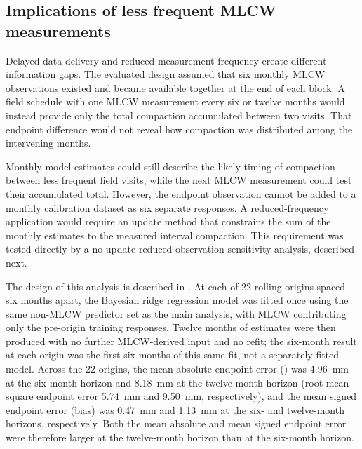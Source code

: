 \subsection{Implications of less frequent MLCW measurements}
\label{subsec:discussion_reduced_sampling}

Delayed data delivery and reduced measurement frequency create different information gaps. The evaluated design assumed that six monthly MLCW observations existed and became available together at the end of each block. A field schedule with one MLCW measurement every six or twelve months would instead provide only the total compaction accumulated between two visits. That endpoint difference would not reveal how compaction was distributed among the intervening months.

Monthly model estimates could still describe the likely timing of compaction between less frequent field visits, while the next MLCW measurement could test their accumulated total. However, the endpoint observation cannot be added to a monthly calibration dataset as six separate responses. A reduced-frequency application would require an update method that constrains the sum of the monthly estimates to the measured interval compaction. This requirement was tested directly by a no-update reduced-observation sensitivity analysis, described next.

The design of this analysis is described in . At each of 22 rolling origins spaced six months apart, the Bayesian ridge regression model was fitted once using the same non-MLCW predictor set as the main analysis, with MLCW contributing only the pre-origin training responses. Twelve months of estimates were then produced with no further MLCW-derived input and no refit; the six-month result at each origin was the first six months of this same fit, not a separately fitted model. Across the 22 origins, the mean absolute endpoint error () was 4.96~mm at the six-month horizon and 8.18~mm at the twelve-month horizon (root mean square endpoint error 5.74~mm and 9.50~mm, respectively), and the mean signed endpoint error (bias) was 0.47~mm and 1.13~mm at the six- and twelve-month horizons, respectively. Both the mean absolute and mean signed endpoint error were therefore larger at the twelve-month horizon than at the six-month horizon.


